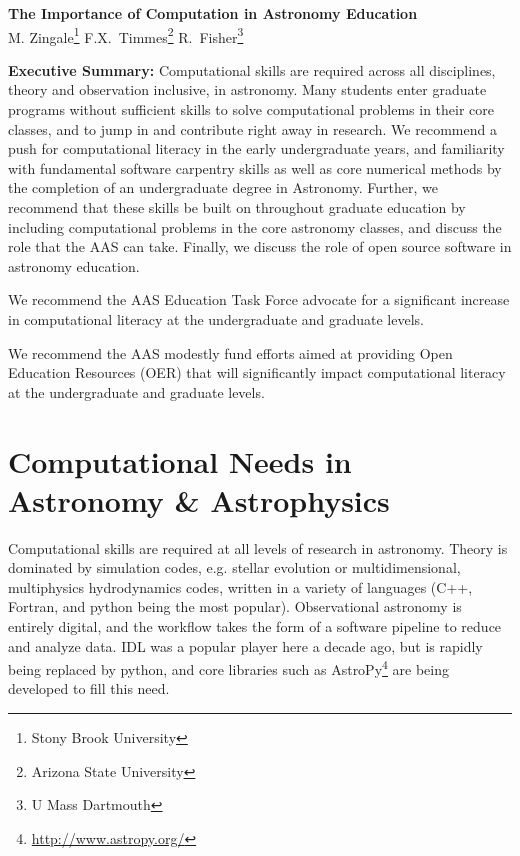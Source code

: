 \documentclass[11pt]{article}
\begin{document}
\thispagestyle{plain}

\begin{center}
{\Large \sffamily \bfseries The Importance of Computation in Astronomy Education} \\
{
M. Zingale\footnote{Stony Brook University}
F.X.~Timmes\footnote{Arizona State University}
R.~Fisher\footnote{U Mass Dartmouth}
}
\end{center}

\begin{tcolorbox}
{\sffamily \bfseries Executive Summary:} Computational skills are required
across all disciplines, theory and observation inclusive, in astronomy.
Many students enter graduate programs without sufficient skills
to solve computational problems in their core classes, and to jump in and
contribute right away in research. We recommend a push for computational
literacy in the early undergraduate years, and familiarity with fundamental
software carpentry skills as well as core numerical methods by the
completion of an undergraduate degree in Astronomy.  Further, we recommend
that these skills be built on throughout graduate education by including
computational problems in the core astronomy classes, and discuss
the role that the AAS can take.  Finally, we discuss
the role of open source software in astronomy education.

\vspace {0.1in} We recommend the AAS Education Task Force advocate for
a significant increase in computational literacy at the undergraduate
and graduate levels.

\vspace {0.1in} We recommend the AAS modestly fund efforts aimed at
providing Open Education Resources (OER) that will significantly
impact computational literacy at the undergraduate and graduate
levels.


\end{tcolorbox}

\section{Computational Needs in Astronomy \& Astrophysics}

Computational skills are required at all levels of research in
astronomy.  Theory is dominated by simulation codes, e.g. stellar
evolution or multidimensional, multiphysics hydrodynamics codes,
written in a variety of languages (C++, Fortran, and python being the
most popular).  Observational astronomy is entirely digital, and the
workflow takes the form of a software pipeline to reduce and analyze
data.  IDL was a popular player here a decade ago, but is rapidly
being replaced by python, and core libraries such as
AstroPy\footnote{\url{http://www.astropy.org/}} are being developed to
fill this need.
\end{document}
